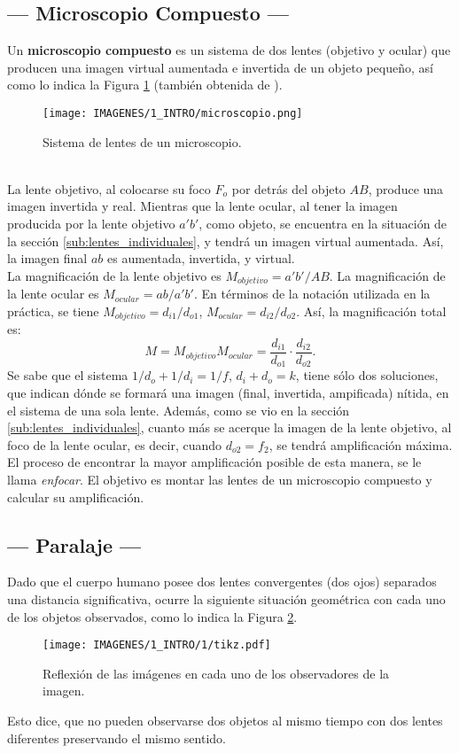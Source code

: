 \documentclass[10pt,a4paper]{article}
\begin{document}
\subsection{--- Microscopio Compuesto ---} %
\label{sub:microscopio_compuesto}
Un \textbf{microscopio compuesto} es un sistema de dos lentes (objetivo y ocular) que producen una imagen virtual aumentada e invertida de un objeto pequeño, así como lo indica la Figura \ref{fig:microscopio} (también obtenida de ).
\begin{figure}[ht]
	\centering
	\texttt{[image: IMAGENES/1\_INTRO/microscopio.png]}
	\caption{Sistema de lentes de un microscopio.}
	\label{fig:microscopio}
\end{figure}\\
La lente objetivo, al colocarse su foco \(F_o\) por detrás del objeto \(AB\), produce una imagen invertida y real.
Mientras que la lente ocular, al tener la imagen producida por la lente objetivo \(a'b'\), como objeto, se encuentra en la situación de la sección \ref{sub:lentes_individuales}, y tendrá un imagen virtual aumentada.
Así, la imagen final \(ab\) es aumentada, invertida, y virtual.\\

La magnificación de la lente objetivo es \(M_{objetivo} = a'b' /AB\).
La magnificación de la lente ocular es \(M_{ocular} = ab/a'b'\).
En términos de la notación utilizada en la práctica, se tiene \(M_{objetivo} = d_{i1} /d_{o1}\), \(M_{ocular} = d_{i2} / d_{o2}\).
Así, la magnificación total es:
\begin{equation}
	M = M_{objetivo} M_{ocular} = \dfrac{d_{i1}}{d_{o1}} \cdot \dfrac{d_{i2}}{d_{o2}}.
	\label{eq:magnificacion_final}
\end{equation}
Se sabe que el sistema \(1/d_o+1/d_i=1/f\), \(d_i+d_o=k\), tiene sólo dos soluciones, que indican dónde se formará una imagen (final, invertida, ampificada) nítida, en el sistema de una sola lente.
Además, como se vio en la sección \ref{sub:lentes_individuales}, cuanto más se acerque la imagen de la lente objetivo, al foco de la lente ocular, es decir, cuando \(d_{o2} =f_2\), se tendrá amplificación máxima. El proceso de encontrar la mayor amplificación posible de esta manera, se le llama \textit{enfocar}. El objetivo es montar las lentes de un microscopio compuesto y calcular su amplificación.

\subsection{--- Paralaje ---} %
\label{sub:paralaje}
Dado que el cuerpo humano posee dos lentes convergentes (dos ojos) separados una distancia significativa, ocurre la siguiente situación geométrica con cada uno de los objetos observados, como lo indica la Figura \ref{fig:paralaje}.
\begin{figure}[ht]
	\centering
	\texttt{[image: IMAGENES/1\_INTRO/1/tikz.pdf]}
	\caption{Reflexión de las imágenes en cada uno de los observadores de la imagen.}
	\label{fig:paralaje}
\end{figure}
Esto dice, que no pueden observarse dos objetos al mismo tiempo con dos lentes diferentes preservando el mismo sentido.
\end{document}
